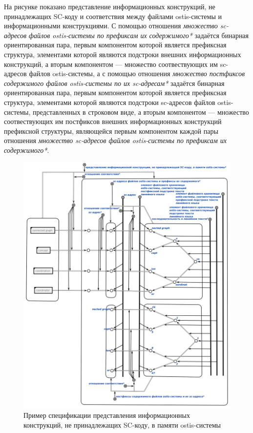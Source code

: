 На рисунке  показано представление информационных конструкций, не принадлежащих SC-коду и соответствия между файлами ostis-системы и информационными конструкциями. С помощью отношения \textit{множество sc-адресов файлов ostis-системы по префиксам их содержимого*} задаётся бинарная ориентированная пара, первым компонентом которой является префиксная структура, элементами которой являются подстроки внешних информационных конструкций, а вторым компонентом --- множество соотвествующих им sc-адресов файлов ostis-системы, а с помощью отношения \textit{множество постфиксов содержимого файлов ostis-системы по их sc-адресам*} задаётся бинарная ориентированная пара, первым компонентом которой является префиксная структура, элементами которой являются подстроки sc-адресов файлов ostis-системы, представленных в строковом виде, а вторым компонентом --- множество соотвествующих им постфиксов внешних информационных конструкций префиксной структуры, являющейся первым компонентом каждой пары отношения \textit{множество sc-адресов файлов ostis-системы по префиксам их содержимого*}.

\begin{figure}[htbp]
	\center
	\includegraphics[scale=0.6]{author/part6/figures/file_in_memory_representation.png}
	\caption{Пример спецификации представления информационных конструкций, не принадлежащих SC-коду, в памяти ostis-системы}
	\label{fig:file_in_memory_representation}
\end{figure}

